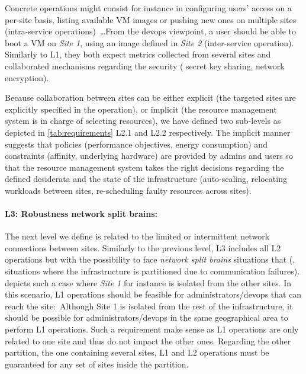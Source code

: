 %
Concrete operations might consist for instance in configuring users'
access on a per-site basis, listing available VM images or pushing new
ones on multiple sites (intra-service operations)~\ldots From the
devops viewpoint, a user should be able to boot a VM on \emph{Site 1},
using an image defined in \emph{Site 2} (inter-service
operation). Similarly to L1, they both expect metrics collected from
several sites and collaborated mechanisms regarding the security (\eg
secret key sharing, network encryption).

Because collaboration between sites can be either explicit (\ie the
targeted sites are explicitly specified in the operation), or implicit
(\ie the resource management system is in charge of selecting
resources), we have defined two sub-levels as depicted in
\cref{tab:requirements} L2.1 and L2.2 respectively.  The implicit
manner suggests that policies (\eg performance objectives, energy
consumption) and constraints (\eg affinity, underlying hardware) are
provided by admins and users so that the resource management system takes
the right decisions regarding the defined desiderata and the state of
the infrastructure (\eg auto-scaling, relocating workloads between
sites, re-scheduling faulty resources across sites).

\paragraph{L3: Robustness \wrt network split brains:}
The next level we define is related to the limited or intermittent
network connections between sites.  Similarly to the previous level,
L3 includes all L2 operations but with the possibility to face
\emph{network split brains} situations that (\ie, situations where the
infrastructure is partitioned due to communication failures).
%
 depicts such a case where \emph{Site 1} for
instance is isolated from the other sites.  In this scenario, L1
operations should be feasible for administrators/devops that can reach
the site:~Although Site 1 is isolated from the rest of
the infrastructure, it should be possible for administrators/devops in
the same geographical area to perform L1 operations. Such a requirement make sense
as L1 operations are only related to one site and thus do not impact the other ones.
%
Regarding the other partition, \ie the one containing
several sites, L1 and L2 operations must be guaranteed for any set of
sites inside the partition.
%

